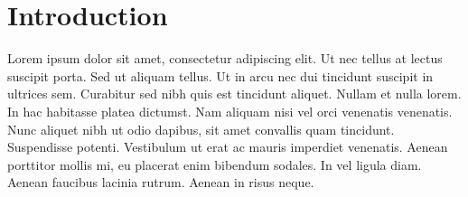 \section{Introduction}

Lorem ipsum dolor sit amet, consectetur adipiscing elit. Ut nec tellus at lectus suscipit porta. Sed ut aliquam tellus. Ut in arcu nec dui tincidunt suscipit in ultrices sem. Curabitur sed nibh quis est tincidunt aliquet. Nullam et nulla lorem. In hac habitasse platea dictumst. Nam aliquam nisi vel orci venenatis venenatis. Nunc aliquet nibh ut odio dapibus, sit amet convallis quam tincidunt. Suspendisse potenti. Vestibulum ut erat ac mauris imperdiet venenatis. Aenean porttitor mollis mi, eu placerat enim bibendum sodales. In vel ligula diam. Aenean faucibus lacinia rutrum. Aenean in risus neque.